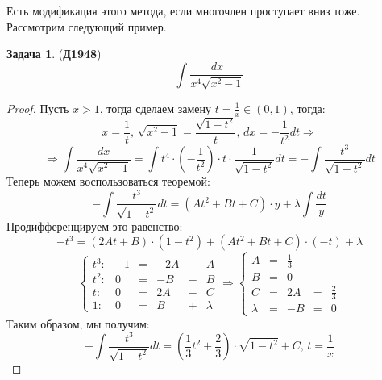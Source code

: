 \documentclass[12pt]{article}
\theoremstyle{definition}
\newtheorem{problem}{Задача}
\DeclareMathOperator{\dint}{\displaystyle\int}
\begin{document}
Есть модификация этого метода, если многочлен проступает вниз тоже. Рассмотрим следующий пример.
\begin{problem}(\textbf{Д1948})
	$$
		\dint \dfrac{dx}{x^4\sqrt{x^2 -1}}
	$$
\end{problem}
\begin{proof}
	Пусть $x > 1$, тогда сделаем замену $t = \tfrac{1}{x} \in (0,1)$, тогда:
	$$
		x = \dfrac{1}{t}, \, \sqrt{x^2 - 1} = \dfrac{\sqrt{1 - t^2}}{t}, \, dx = -\dfrac{1}{t^2}dt \Rightarrow
	$$
	$$
		\Rightarrow \dint \dfrac{dx}{x^4\sqrt{x^2 -1}} = \dint t^4{\cdot}\left(-\dfrac{1}{t^2}\right){\cdot}t{\cdot}\dfrac{1}{\sqrt{1 - t^2}}dt = -\dint \dfrac{t^3}{\sqrt{1- t^2}}dt
	$$
	Теперь можем воспользоваться теоремой:
	$$
		-\dint \dfrac{t^3}{\sqrt{1- t^2}}dt = (At^2 + Bt + C){\cdot}y + \lambda \dint\dfrac{dt}{y} 
	$$
	Продифференцируем это равенство:
	$$
		-t^3 = (2At +B){\cdot}(1 -t^2)  + (At^2 + Bt +C){\cdot}(-t) + \lambda
	$$
	$$
		\left\{
			\begin{matrix}
				t^3\colon& -1 &=& -2A &-& A  \\
				t^2\colon&  0 &=& -B &-& B  \\
				t\colon & 0 &=& 2A &-&C  \\
				1 \colon & 0 &=& B &+& \lambda  
			\end{matrix}
		\right. \Rightarrow
		\left\{
			\begin{matrix}
				A &=& \tfrac{1}{3}&&\\[5pt]
				B &=& 0&&\\[5pt]
				C &=& 2A &=& \tfrac{2}{3}\\[5pt]
				\lambda &=& -B &=& 0
			\end{matrix}
		\right.
	$$
	Таким образом, мы получим:
	$$
		-\dint \dfrac{t^3}{\sqrt{1- t^2}}dt = \left(\dfrac{1}{3}t^2 + \dfrac{2}{3}\right){\cdot}\sqrt{1-t^2} + C, \, t = \dfrac{1}{x}
	$$
\end{proof}
\end{document}
